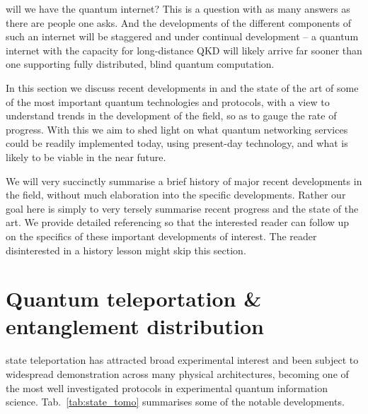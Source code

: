 %
%

\startnormtable


 will we have the quantum internet? This is a question with as many answers as there are people one asks. And the developments of the different components of such an internet will be staggered and under continual development -- a quantum internet with the capacity for long-distance QKD will likely arrive far sooner than one supporting fully distributed, blind quantum computation.

In this section we discuss recent developments in and the state of the art of some of the most important quantum technologies and protocols, with a view to understand trends in the development of the field, so as to gauge the rate of progress. With this we aim to shed light on what quantum networking services could be readily implemented today, using present-day technology, and what is likely to be viable in the near future.

We will very succinctly summarise a brief history of major recent developments in the field, without much elaboration into the specific developments. Rather our goal here is simply to very tersely summarise recent progress and the state of the art. We provide detailed referencing so that the interested reader can follow up on the specifics of these important developments of interest. The reader disinterested in a history lesson might skip this section.

%
%

\section{Quantum teleportation \& entanglement distribution}   

 state teleportation has attracted broad experimental interest and been subject to widespread demonstration across many physical architectures, becoming one of the most well investigated protocols in experimental quantum information science. Tab.~\ref{tab:state_tomo} summarises some of the notable developments.

